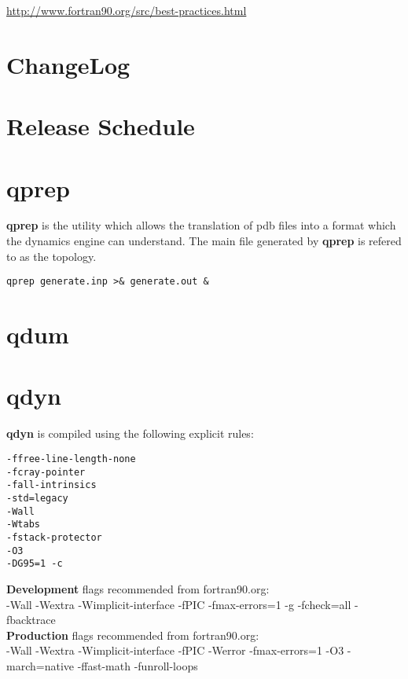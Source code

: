 \documentclass[10pt, oneside, pdftex]{article}
\begin{document}
\url{http://www.fortran90.org/src/best-practices.html}


\section{ChangeLog}
\label{changelog}


\section{Release Schedule}
\label{schedule}


\section{qprep}
\label{qprep}
\textbf{qprep} is the utility which allows the translation of pdb files into
a format which the dynamics engine can understand. The main file generated
by \textbf{qprep} is refered to as the topology.

\lstset{language=sh, frame=single}
\begin{Verbatim}
qprep generate.inp >& generate.out &
\end{Verbatim}


\section{qdum}
\label{qdum}


\section{qdyn}
\label{qdyn}
\textbf{qdyn} is compiled using the following explicit rules:
\begin{Verbatim}
-ffree-line-length-none
-fcray-pointer
-fall-intrinsics
-std=legacy
-Wall
-Wtabs
-fstack-protector
-O3
-DG95=1 -c
\end{Verbatim}

\textbf{Development} flags recommended from fortran90.org:\\
-Wall -Wextra -Wimplicit-interface -fPIC -fmax-errors=1 -g -fcheck=all -fbacktrace\\

\textbf{Production} flags recommended from fortran90.org:\\
-Wall -Wextra -Wimplicit-interface -fPIC -Werror -fmax-errors=1 -O3 -march=native -ffast-math -funroll-loops\\
\end{document}
